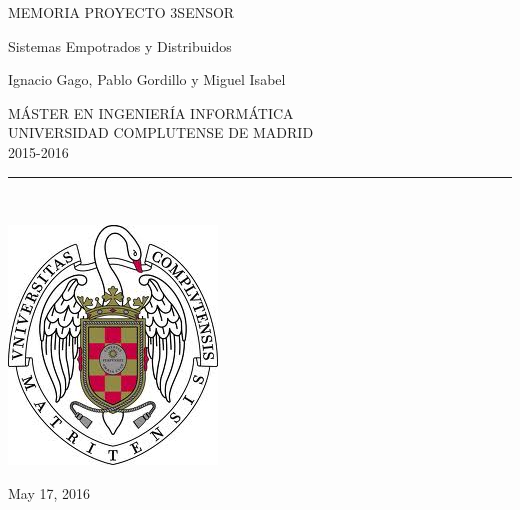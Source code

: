 \begin{center}

   \vspace{1cm}


   {\Large MEMORIA PROYECTO 3SENSOR}\\

   \vspace{0.5cm}

   {\Large Sistemas Empotrados y Distribuidos }\\

   \vspace{0.5cm}




   {\large Ignacio Gago, Pablo Gordillo y Miguel Isabel}\\

   \vspace{0.5cm}




   M\'ASTER EN INGENIER\'IA INFORM\'ATICA\\
   UNIVERSIDAD COMPLUTENSE DE MADRID \\
   2015-2016\\


   \vspace{0.65cm}
   \rule{2in}{0.5pt}\\
   \vspace{0.85cm}

  \includegraphics[height=2.5in]{escudo.jpg}
  

   \vspace{0.5cm}


   \vspace{0.5cm}






   May 17, 2016 \\
   \vspace{1cm}

\end{center}

